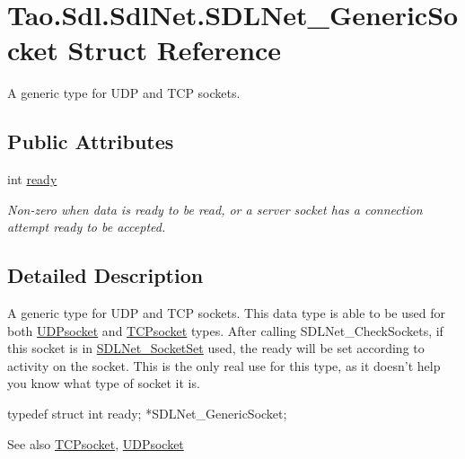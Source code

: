 \hypertarget{struct_tao_1_1_sdl_1_1_sdl_net_1_1_s_d_l_net___generic_socket}{
\section{Tao.Sdl.SdlNet.SDLNet\_\-GenericSocket Struct Reference}
\label{struct_tao_1_1_sdl_1_1_sdl_net_1_1_s_d_l_net___generic_socket}
}


A generic type for UDP and TCP sockets.  


\subsection*{Public Attributes}
\begin{DoxyCompactItemize}
\item 
int \hyperlink{struct_tao_1_1_sdl_1_1_sdl_net_1_1_s_d_l_net___generic_socket_afa92dfcd76cd5e28410d90f6ed6514ea}{ready}
\begin{DoxyCompactList}\small\item\em Non-\/zero when data is ready to be read, or a server socket has a connection attempt ready to be accepted. \item\end{DoxyCompactList}\end{DoxyCompactItemize}


\subsection{Detailed Description}
A generic type for UDP and TCP sockets. This data type is able to be used for both \hyperlink{struct_tao_1_1_sdl_1_1_sdl_net_1_1_u_d_psocket}{UDPsocket} and \hyperlink{struct_tao_1_1_sdl_1_1_sdl_net_1_1_t_c_psocket}{TCPsocket} types. After calling SDLNet\_\-CheckSockets, if this socket is in \hyperlink{struct_tao_1_1_sdl_1_1_sdl_net_1_1_s_d_l_net___socket_set}{SDLNet\_\-SocketSet} used, the ready will be set according to activity on the socket. This is the only real use for this type, as it doesn't help you know what type of socket it is. 
\begin{DoxyCode}
                    typedef struct {
                        int ready;
                    } *SDLNet_GenericSocket;
\end{DoxyCode}


\begin{DoxySeeAlso}{See also}
\hyperlink{struct_tao_1_1_sdl_1_1_sdl_net_1_1_t_c_psocket}{TCPsocket}, \hyperlink{struct_tao_1_1_sdl_1_1_sdl_net_1_1_u_d_psocket}{UDPsocket}


\end{DoxySeeAlso}


